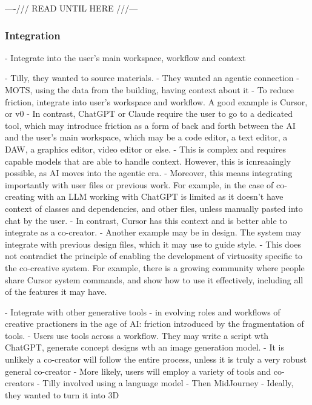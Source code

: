 ----/// READ UNTIL HERE ///---

\subsubsection{Integration}

- Integrate into the user's main workspace, workflow and context

- Tilly, they wanted to source materials. 
- They wanted an agentic connection
- MOTS, using the data from the building, having context about it
    - To reduce friction, integrate into user's workspace and workflow. A good example is Cursor, or v0
    - In contrast, ChatGPT or Claude require the user to go to a dedicated tool, which may introduce friction as a form of back and forth between the AI and the user's main workspace, which may be a code editor, a text editor, a DAW, a graphics editor, video editor or else. 
    - This is complex and requires capable models that are able to handle context. However, this  is icnreaaingly possible, as AI moves into the agentic era. 
    - Moreover, this means integrating importantly with user files or previous work. For example, in the case of co-creating with an LLM working with ChatGPT is limited as it doesn't have context of classes and dependencies, and other files, unless manually pasted into chat by the user. 
    - In contrast, Cursor has this context and is better able to integrate as a co-creator. 
    - Another example may be in design. The system may integrate with previous design files, which it may use to guide style. 
    - This does not contradict the principle of enabling the development of virtuosity specific to the co-creative system. For example, there is a growing community where people share Cursor system commands, and show how to use it effectively, including all of the features it may have. 

- Integrate with other generative tools
    - \cite{Palani2024-on} in evolving roles and workflows of creative practioners in the age of AI: friction introduced by the fragmentation of tools. 
    - Users use tools across a workflow. They may write a script wth ChatGPT, generate concept designs wth an image generation model. 
    - It is unlikely a co-creator will follow the entire process, unless it is truly a very robust general co-creator
    - More likely, users will employ a variety of tools and co-creators
    - Tilly involved using a language model
    - Then MidJourney
    - Ideally, they wanted to turn it into 3D
    


